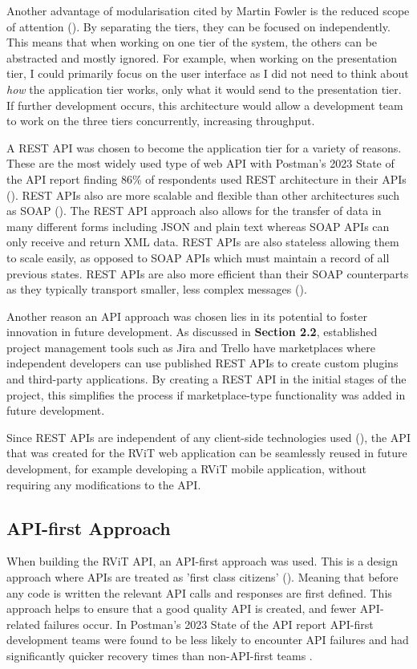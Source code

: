 \documentclass[l4proj.tex]{subfiles}
\begin{document}
Another advantage of modularisation cited by Martin Fowler is the reduced scope of attention (\cite{Fowler2015}). By separating the tiers, they can be focused on independently. This means that when working on one tier of the system, the others can be abstracted and mostly ignored. For example, when working on the presentation tier, I could primarily focus on the user interface as I did not need to think about \textit{how} the application tier works, only what it would send to the presentation tier. If further development occurs, this architecture would allow a development team to work on the three tiers concurrently, increasing throughput.

A REST API was chosen to become the application tier for a variety of reasons. These are the most widely used type of web API with Postman's 2023 State of the API report finding 86\% of respondents used REST architecture in their APIs (\cite{Postman2023}). REST APIs also are more scalable and flexible than other architectures such as SOAP (\cite{AWS}). The REST API approach also allows for the transfer of data in many different forms including JSON and plain text whereas SOAP APIs can only receive and return XML data. REST APIs are also stateless allowing them to scale easily, as opposed to SOAP APIs which must maintain a record of all previous states. REST APIs are also more efficient than their SOAP counterparts as they typically transport smaller, less complex messages (\cite{AWS}).

Another reason an API approach was chosen lies in its potential to foster innovation in future development. As discussed in \textbf{Section 2.2}, established project management tools such as Jira and Trello have marketplaces where independent developers can use published REST APIs to create custom plugins and third-party applications. By creating a REST API in the initial stages of the project, this simplifies the process if marketplace-type functionality was added in future development. 

Since REST APIs are independent of any client-side technologies used (\cite{PostmanBlog2023}), the API that was created for the RViT web application can be seamlessly reused in future development, for example developing a RViT mobile application, without requiring any modifications to the API. 


\subsection{API-first Approach}
When building the RViT API, an API-first approach was used. This is a design approach where APIs are treated as 'first class citizens' (\cite{Wagner(Swagger)}). Meaning that before any code is written the relevant API calls and responses are first defined. This approach helps to ensure that a good quality API is created, and fewer API-related failures occur. In Postman's 2023 State of the API report API-first development teams were found to be less likely to encounter API failures and had significantly quicker recovery times than non-API-first teams \cite{PostmanAPIFirst}. 
\end{document}
